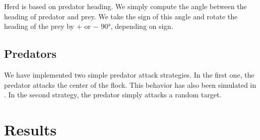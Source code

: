 \documentclass[9pt]{pnas-new}
\begin{document}
Herd is based on predator heading. We simply compute the angle between the heading of predator and prey.
We take the sign of this angle and rotate the heading of the prey by $+$ or $-$ 90°, depending on sign.

\subsection*{Predators}

We have implemented two simple predator attack strategies. In the first one, the predator
attacks the center of the flock. This behavior has also been simulated in \cite{JDemsar_predator_attacks}.
In the second strategy, the predator simply attacks a random target.

\section*{Results}
\end{document}
